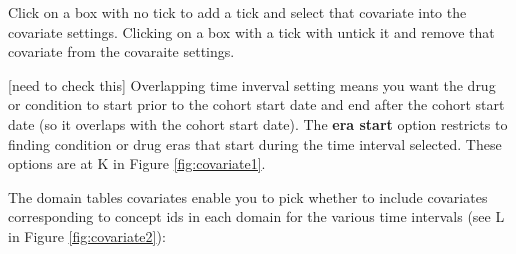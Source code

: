 \documentclass[11pt]{book}
\begin{document}
Click on a box with no tick to add a tick and select that covariate into
the covariate settings. Clicking on a box with a tick with untick it and
remove that covariate from the covaraite settings.

{[}need to check this{]} Overlapping time inverval setting means you
want the drug or condition to start prior to the cohort start date and
end after the cohort start date (so it overlaps with the cohort start
date). The \textbf{era start} option restricts to finding condition or
drug eras that start during the time interval selected. These options
are at K in Figure \ref{fig:covariate1}.

The domain tables covariates enable you to pick whether to include
covariates corresponding to concept ids in each domain for the various
time intervals (see L in Figure \ref{fig:covariate2}):
\end{document}
